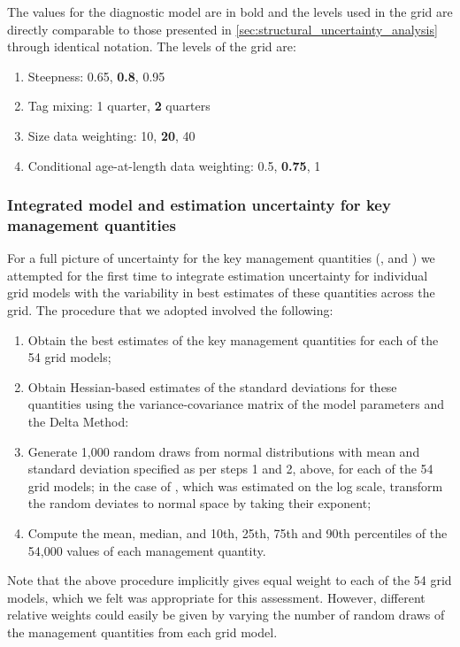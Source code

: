 The values for the diagnostic model are in bold and the levels used in the grid are directly comparable to those presented in \autoref{sec:structural_uncertainty_analysis} through identical notation. The levels of the grid are:

\begin{enumerate}
  \item Steepness: 0.65, \textbf{0.8}, 0.95
  \item Tag mixing: 1 quarter, \textbf{2} quarters
  \item Size data weighting: 10, \textbf{20}, 40
  \item Conditional age-at-length data weighting: 0.5, \textbf{0.75}, 1
\end{enumerate}

\subsubsection{Integrated model and estimation uncertainty for key management quantities}
\label{sec:estimation_uncertainty_approach}

For a full picture of uncertainty for the key management quantities (\sbrsbfo, \sbrsbmsy and \fref) we attempted for the first time to integrate estimation uncertainty for individual grid models with the variability in best estimates of these quantities across the grid. The procedure that we adopted involved the following:

\begin{enumerate}
  \item Obtain the best estimates of the key management quantities for each of the 54 grid models;
  \item Obtain Hessian-based estimates of the standard deviations for these quantities using the variance-covariance matrix of the model parameters and the Delta Method:
  \item Generate 1,000 random draws from normal distributions with mean and standard deviation specified as per steps 1 and 2, above, for each of the 54 grid models; in the case of \sbrsbfo, which was estimated on the log scale, transform the random deviates to normal space by taking their exponent;
  \item Compute the mean, median, and 10th, 25th, 75th and 90th percentiles of the 54,000 values of each management quantity.
\end{enumerate}

Note that the above procedure implicitly gives equal weight to each of the 54 grid models, which we felt was appropriate for this assessment. However, different relative weights could easily be given by varying the number of random draws of the management quantities from each grid model.

